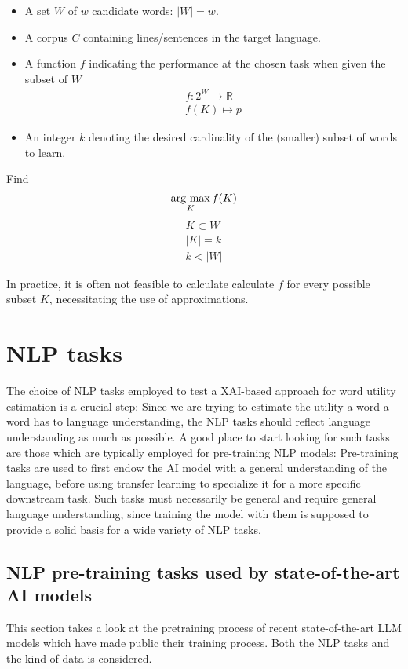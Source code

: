 \begin{itemize}
	\item A set $W$ of $w$ candidate words: $|W| = w$.

	\item A corpus $C$ containing lines/sentences in the target language.

	\item A function $f$ indicating the performance at the chosen task when given the subset of $W$
	      \begin{align*}f : 2^{W} \to \mathbb{R} \\
		      f (K) \mapsto p
	      \end{align*}

	\item An integer $k$ denoting the desired cardinality of the (smaller) subset of words to learn.
\end{itemize}
Find
\[
	\mathop{\rm arg~max}\limits_{K} f(K)
\]
\begin{align*}
	K \subset W \\
	|K| = k     \\
	k < |W|
\end{align*}

In practice, it is often not feasible to calculate calculate $f$ for every possible subset $K$, necessitating the use of approximations.



\section{NLP tasks}
The choice of NLP tasks employed to test a XAI-based approach for word utility estimation is a crucial step:
Since we are trying to estimate the utility a word a word has to language understanding, the NLP tasks should reflect language understanding as much as possible.
A good place to start looking for such tasks are those which are typically employed for pre-training NLP models:
Pre-training tasks are used to first endow the AI model with a general understanding of the language, before using transfer learning to specialize it for a more specific downstream task.
Such tasks must necessarily be general and require general language understanding, since training the model with them is supposed to provide a solid basis for a wide variety of NLP tasks.

\subsection{NLP pre-training tasks used by state-of-the-art AI models}
This section takes a look at the pretraining process of recent state-of-the-art LLM models which have made public their training process.
Both the NLP tasks and the kind of data is considered.


